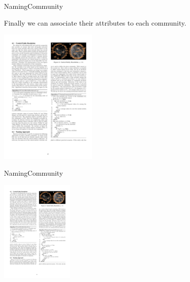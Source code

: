 \begin{frame}{NamingCommunity}

 Finally we can associate their attributes to each community.
 \begin{center}
	\includegraphics[height=6.7cm]{images/namingCommunity1.pdf}
\end{center}
\end{frame}

\begin{frame}{NamingCommunity}
 \begin{center}
	\includegraphics[height=5cm]{images/namingCommunity2.pdf}
\end{center}
\end{frame}
